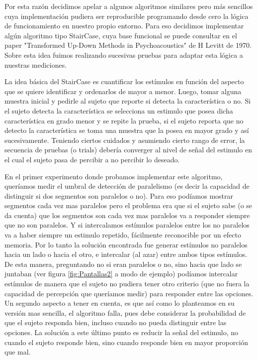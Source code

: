 \documentclass{article}
\begin{document}
    Por esta razón decidimos apelar a algunos algoritmos similares pero más sencillos cuya implementación pudiera ser reproducible programando desde cero la lógica de funcionamiento en nuestro propio entorno. Para eso decidimos implementar algún algoritmo tipo StairCase, cuya base funcional se puede consultar en el paper "Transformed Up-Down Methods in Psychoacoustics"\cite{staircase} de H Levitt de 1970. Sobre esta idea fuimos realizando sucesivas pruebas para adaptar esta lógica a nuestras mediciones. 
    
    La idea básica del StairCase es cuantificar los estímulos en función del aspecto que se quiere identificar y ordenarlos de mayor a menor. Luego, tomar alguna muestra inicial y pedirle al sujeto que reporte si detecta la característica o no. Si el sujeto detecta la característica se selecciona un estimulo que posea dicha característica en grado menor y se repite la prueba, si el sujeto reporta que no detecto la característica se toma una muestra que la posea en mayor grado y así sucesivamente. Teniendo ciertos cuidados y asumiendo cierto rango de error, la secuencia de pruebas (o trials) debería converger al nivel de señal del estimulo en el cual el sujeto pasa de percibir a no percibir lo deseado. 
    
    En el primer experimento donde probamos implementar este algoritmo, queríamos medir el umbral de 
    detección de paralelismo (es decir la capacidad de distinguir si dos segmentos son paralelos o no). Para eso podíamos mostrar segmentos cada vez mas paralelos pero el problema era que si el sujeto sabe (o se da cuenta) que los segmentos son cada vez mas paralelos va a responder siempre que no son paralelos. Y si intercalamos estímulos paralelos entre los no paralelos va a haber siempre un estimulo repetido, fácilmente reconocible por un efecto memoria. Por lo tanto la solución encontrada fue generar estímulos no paralelos hacia un lado o hacia el otro, e intercalar (al azar) entre ambos tipos estímulos. De esta manera, preguntando no si eran paralelos o no, sino hacia que lado se juntaban (ver figura \ref{fig:Pantallas2} a modo de ejemplo) podíamos intercalar estímulos de manera que el sujeto no pudiera tener otro criterio (que no fuera la capacidad de percepción que queríamos medir) para responder entre las opciones. Un segundo aspecto a tener en cuenta, es que así como lo planteamos en su versión mas sencilla, el algoritmo falla, pues debe considerar la probabilidad de que el sujeto responda bien, incluso cuando no pueda distinguir entre las opciones. La solución a este último punto es reducir la señal del estimulo, no cuando el sujeto responde bien, sino cuando responde bien en mayor proporción que mal. 
    
\end{document}
